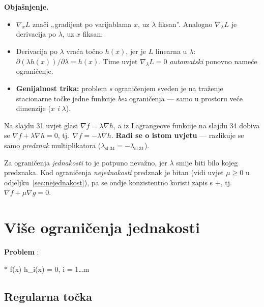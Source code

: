 \textbf{Objašnjenje.}
\begin{itemize}
  \item $\nabla_x L$ znači „gradijent po varijablama $x$, uz $\lambda$ fiksan”.
        Analogno $\nabla_\lambda L$ je derivacija po $\lambda$, uz $x$ fiksan.
  \item Derivacija po $\lambda$ vraća točno $h(x)$, jer je $L$ linearna u
        $\lambda$: $\partial(\lambda h(x))/\partial\lambda = h(x)$. Time uvjet
        $\nabla_\lambda L = 0$ \emph{automatski} ponovno nameće ograničenje.
  \item \textbf{Genijalnost trika:} problem \emph{s} ograničenjem sveden je na
        traženje stacionarne točke jedne funkcije \emph{bez} ograničenja ---
        samo u prostoru veće dimenzije ($x$ \emph{i} $\lambda$).
\end{itemize}

\begin{napomena}
Na slajdu 31 uvjet glasi $\nabla f = \lambda\nabla h$, a iz Lagrangeove funkcije
na slajdu 34 dobiva se $\nabla f + \lambda\nabla h = 0$, tj.\
$\nabla f = -\lambda\nabla h$. \textbf{Radi se o istom uvjetu} --- razlikuje se
samo \emph{predznak} multiplikatora ($\lambda_{\text{sl.34}} =
-\lambda_{\text{sl.31}}$).

Za ograničenja \emph{jednakosti} to je potpuno nevažno, jer $\lambda$ smije biti
bilo kojeg predznaka. Kod ograničenja \emph{nejednakosti} predznak je bitan
(vidi uvjet $\mu \ge 0$ u odjeljku~\ref{sec:nejednakost}), pa se ondje
konzistentno koristi zapis s $+$, tj.\ $\nabla f + \mu\nabla g = 0$.
\end{napomena}

\section{Više ograničenja jednakosti}
\label{sec:vise-jednakosti}

\textbf{Problem} :
\begin{jednadzba}{$*$}
\label{eq:zvj2}
\min f(x) \quad{}\quad h_i(x) = 0,\; i = 1\dots m
\end{jednadzba}

\subsection{Regularna točka}

